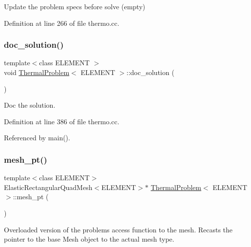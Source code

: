 Update the problem specs before solve (empty) 



Definition at line 266 of file thermo.\+cc.

\mbox{\label{classThermalProblem_aa085f248542811385fefe623a9193fd8}} 
\subsubsection{\texorpdfstring{doc\+\_\+solution()}{doc\_solution()}}
{\footnotesize\ttfamily template$<$class E\+L\+E\+M\+E\+NT $>$ \\
void \hyperlink{classThermalProblem}{Thermal\+Problem}$<$ E\+L\+E\+M\+E\+NT $>$\+::doc\+\_\+solution (\begin{DoxyParamCaption}{ }\end{DoxyParamCaption})}



Doc the solution. 



Definition at line 386 of file thermo.\+cc.



Referenced by main().

\mbox{\label{classThermalProblem_ac1ebc681e22c65c384aa63a7e9da6129}} 
\subsubsection{\texorpdfstring{mesh\+\_\+pt()}{mesh\_pt()}}
{\footnotesize\ttfamily template$<$class E\+L\+E\+M\+E\+NT$>$ \\
Elastic\+Rectangular\+Quad\+Mesh$<$E\+L\+E\+M\+E\+NT$>$$\ast$ \hyperlink{classThermalProblem}{Thermal\+Problem}$<$ E\+L\+E\+M\+E\+NT $>$\+::mesh\+\_\+pt (\begin{DoxyParamCaption}{ }\end{DoxyParamCaption})\hspace{0.3cm}{\ttfamily [inline]}}



Overloaded version of the problem\textquotesingle{}s access function to the mesh. Recasts the pointer to the base Mesh object to the actual mesh type. 



